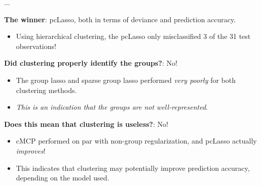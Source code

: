 \documentclass[8pt]{beamer}
\newcommand{\mys}{\vspace{0.5cm} \pause
}
\begin{document}
\begin{frame}{$\ldots$}

\textbf{The winner}: pcLasso, both in terms of deviance and prediction accuracy.
\begin{itemize}
    \item Using hierarchical clustering, the pcLasso only misclassified 3 of the 31 test observations! %
\end{itemize} \mys

\textbf{Did clustering properly identify the groups?}: No!
\begin{itemize}
    \item The group lasso and sparse group lasso performed \textit{very poorly} for both clustering methods.
    \item \textit{This is an indication that the groups are not well-represented}.
\end{itemize} \mys

\textbf{Does this mean that clustering is useless?}: No!
\begin{itemize}
    \item cMCP performed on par with non-group regularization, and pcLasso actually \textit{improves}!
    \item This indicates that clustering may potentially improve prediction accuracy, depending on the model used.
\end{itemize}
    
\end{frame}


\end{document}
